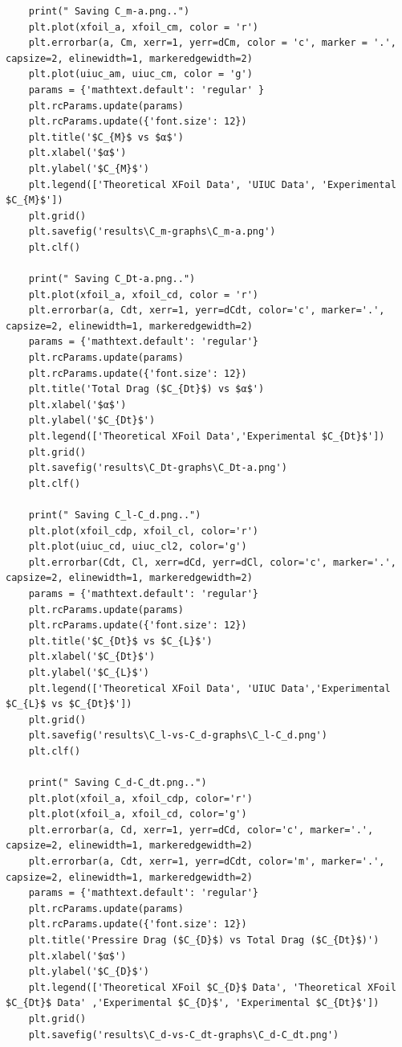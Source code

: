 \documentclass[11pt, letterpaper]{article}
\begin{document}
\begin{appendices}
\begin{verbatim}
    print(" Saving C_m-a.png..")
    plt.plot(xfoil_a, xfoil_cm, color = 'r')
    plt.errorbar(a, Cm, xerr=1, yerr=dCm, color = 'c', marker = '.', capsize=2, elinewidth=1, markeredgewidth=2)
    plt.plot(uiuc_am, uiuc_cm, color = 'g')
    params = {'mathtext.default': 'regular' }
    plt.rcParams.update(params)
    plt.rcParams.update({'font.size': 12})
    plt.title('$C_{M}$ vs $α$')
    plt.xlabel('$α$')
    plt.ylabel('$C_{M}$')
    plt.legend(['Theoretical XFoil Data', 'UIUC Data', 'Experimental $C_{M}$'])
    plt.grid()
    plt.savefig('results\C_m-graphs\C_m-a.png')
    plt.clf()
    
    print(" Saving C_Dt-a.png..")
    plt.plot(xfoil_a, xfoil_cd, color = 'r')
    plt.errorbar(a, Cdt, xerr=1, yerr=dCdt, color='c', marker='.', capsize=2, elinewidth=1, markeredgewidth=2)
    params = {'mathtext.default': 'regular'}
    plt.rcParams.update(params)
    plt.rcParams.update({'font.size': 12})
    plt.title('Total Drag ($C_{Dt}$) vs $α$')
    plt.xlabel('$α$')
    plt.ylabel('$C_{Dt}$')
    plt.legend(['Theoretical XFoil Data','Experimental $C_{Dt}$'])
    plt.grid()
    plt.savefig('results\C_Dt-graphs\C_Dt-a.png')
    plt.clf()

    print(" Saving C_l-C_d.png..")
    plt.plot(xfoil_cdp, xfoil_cl, color='r')
    plt.plot(uiuc_cd, uiuc_cl2, color='g')
    plt.errorbar(Cdt, Cl, xerr=dCd, yerr=dCl, color='c', marker='.', capsize=2, elinewidth=1, markeredgewidth=2)
    params = {'mathtext.default': 'regular'}
    plt.rcParams.update(params)
    plt.rcParams.update({'font.size': 12})
    plt.title('$C_{Dt}$ vs $C_{L}$')
    plt.xlabel('$C_{Dt}$')
    plt.ylabel('$C_{L}$')
    plt.legend(['Theoretical XFoil Data', 'UIUC Data','Experimental $C_{L}$ vs $C_{Dt}$'])
    plt.grid()
    plt.savefig('results\C_l-vs-C_d-graphs\C_l-C_d.png')
    plt.clf()

    print(" Saving C_d-C_dt.png..")
    plt.plot(xfoil_a, xfoil_cdp, color='r')
    plt.plot(xfoil_a, xfoil_cd, color='g')
    plt.errorbar(a, Cd, xerr=1, yerr=dCd, color='c', marker='.', capsize=2, elinewidth=1, markeredgewidth=2)
    plt.errorbar(a, Cdt, xerr=1, yerr=dCdt, color='m', marker='.', capsize=2, elinewidth=1, markeredgewidth=2)
    params = {'mathtext.default': 'regular'}
    plt.rcParams.update(params)
    plt.rcParams.update({'font.size': 12})
    plt.title('Pressire Drag ($C_{D}$) vs Total Drag ($C_{Dt}$)')
    plt.xlabel('$α$')
    plt.ylabel('$C_{D}$')
    plt.legend(['Theoretical XFoil $C_{D}$ Data', 'Theoretical XFoil $C_{Dt}$ Data' ,'Experimental $C_{D}$', 'Experimental $C_{Dt}$'])
    plt.grid()
    plt.savefig('results\C_d-vs-C_dt-graphs\C_d-C_dt.png')
\end{verbatim}
\newpage

\end{appendices}
\end{document}
